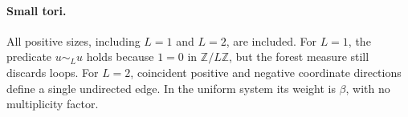 \documentclass[11pt]{article}
\theoremstyle{definition}
\theoremstyle{remark}
\newcommand{\ZZ}{\mathbb Z}
\newcommand{\1}{\mathbf 1}
\begin{document}
\paragraph{Small tori.}
All positive sizes, including $L=1$ and $L=2$, are included. For $L=1$,
the predicate $u\sim_L u$ holds because $1=0$ in $\ZZ/L\ZZ$, but the
forest measure still discards loops. For $L=2$, coincident positive and
negative coordinate directions define a single undirected edge. In the
uniform system its weight is $\beta$, with no multiplicity factor.
\end{document}
